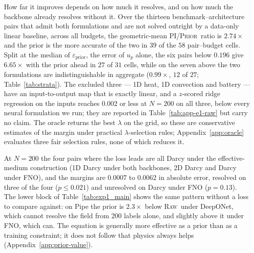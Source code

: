 \documentclass{article}
\newcommand{\armraw}{\textsc{Raw}}
\newcommand{\armpi}{\textsc{PI}}
\newcommand{\armprior}{\textsc{Prior}}
\begin{document}
How far it improves depends on how much it resolves, and on how much the backbone already
resolves without it. Over the thirteen benchmark--architecture pairs that admit both formulations and are not solved
outright by a data-only linear baseline, across all budgets, the geometric-mean
\armpi/\armprior\ ratio is $2.74\times$ and the prior is the more accurate of the two in $39$ of
the $58$ pair--budget cells. Split at the median of $\varepsilon_{\mathrm{prior}}$, the error of
$u_p$ alone, the six pairs below $0.196$ give $6.65\times$ with the prior ahead in $27$ of $31$
cells, while on the seven above the two formulations are indistinguishable in aggregate
($0.99\times$, $12$ of $27$; Table~\ref{tab:strata}). The excluded three --- 1D heat, 1D
convection and battery --- have an input-to-output map that is exactly linear, and a $z$-scored
ridge regression on the inputs reaches $0.002$ or less at $N{=}200$ on all three, below every
neural formulation we run; they are reported in Table~\ref{tab:app-e1-raw} but carry no claim.
The oracle returns the best $\lambda$ on the grid, so these are conservative estimates of the
margin under practical $\lambda$-selection rules; Appendix~\ref{app:oracle} evaluates three fair
selection rules, none of which reduces it.

At $N{=}200$ the four pairs where the loss leads are all Darcy under the effective-medium construction
(1D Darcy under both backbones, 2D Darcy and Darcy \citep{li2020fourier} under \textsc{FNO}), and
the margins are $0.0007$ to $0.0062$ in absolute error, resolved on three of the four
($p\le0.021$) and unresolved on Darcy under \textsc{FNO} ($p=0.13$). The lower block of
Table~\ref{tab:exp1_main} shows the same pattern without a loss to compare against: on Pipe the
prior is $2.3\times$ below \armraw\ under DeepONet, which cannot resolve the field from $200$
labels alone, and slightly above it under \textsc{FNO}, which can. The equation is generally more
effective as a prior than as a training constraint; it does not follow that physics always helps
(Appendix~\ref{app:prior-value}).
\end{document}

